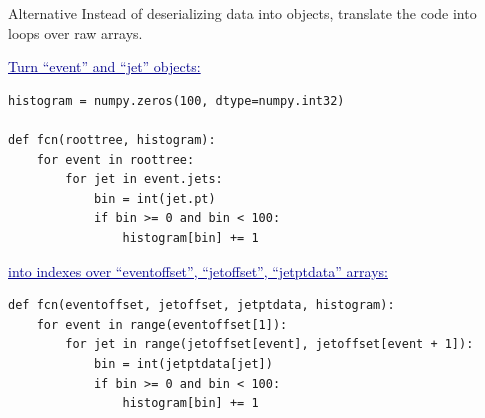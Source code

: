 \documentclass{beamer}
\begin{document}
\begin{frame}[fragile]{Alternative}
\vspace{0.5 cm}
Instead of deserializing data into objects, translate the code into loops over raw arrays.

\vspace{0.25 cm}
\textcolor{darkblue}{\underline{Turn ``event'' and ``jet'' objects:}}

\scriptsize
\begin{verbatim}
histogram = numpy.zeros(100, dtype=numpy.int32)

def fcn(roottree, histogram):
    for event in roottree:
        for jet in event.jets:
            bin = int(jet.pt)
            if bin >= 0 and bin < 100:
                histogram[bin] += 1
\end{verbatim}

\vspace{0.25 cm}
\textcolor{darkblue}{\normalsize \underline{into indexes over ``eventoffset'', ``jetoffset'', ``jetptdata'' arrays:}}

\scriptsize
\begin{verbatim}
def fcn(eventoffset, jetoffset, jetptdata, histogram):
    for event in range(eventoffset[1]):
        for jet in range(jetoffset[event], jetoffset[event + 1]):
            bin = int(jetptdata[jet])
            if bin >= 0 and bin < 100:
                histogram[bin] += 1
\end{verbatim}

\end{frame}
\end{document}
